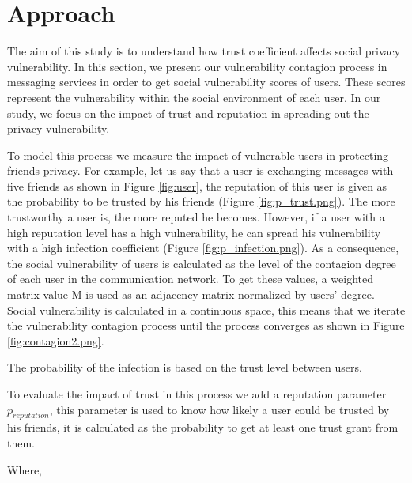 \section{Approach} \label{sec:Approach}

The aim of this study is to understand how trust coefficient affects social privacy vulnerability.
In this section,
	we present our vulnerability contagion process in messaging services in order to get social vulnerability scores of users.
These scores represent the vulnerability within the social environment of each user.
In our study,
	we focus on the impact of trust and reputation in spreading out the privacy vulnerability.

To model this process we measure the impact of vulnerable users in protecting friends privacy.
For example,
	let us say that a user is exchanging messages with five friends as shown in Figure \ref{fig:user},
	the reputation of this user is given as the probability to be trusted by his friends (Figure \ref{fig:p_trust.png}).
The more trustworthy a user is,
	the more reputed he becomes.
However,
	if a user with a high reputation level has a high vulnerability,
	he can spread his vulnerability with a high infection coefficient (Figure \ref{fig:p_infection.png}).
As a consequence,
	the social vulnerability of users is calculated as the level of the contagion degree of each user in the communication network.
To get these values,
	a weighted matrix value M is used as an adjacency matrix normalized by users' degree.
Social vulnerability is calculated in a continuous space,
	this means that we iterate the vulnerability contagion process until the process converges as shown in Figure \ref{fig:contagion2.png}.

The probability of the infection is based on the trust level between users.


To evaluate the impact of trust in this process we add a reputation parameter $p_{reputation}$,
	this parameter is used to know how likely a user could be trusted by his friends,
	it is calculated as the probability to get at least one trust grant from them.


Where,

